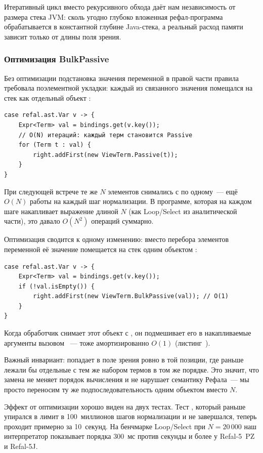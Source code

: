 Итеративный цикл вместо рекурсивного обхода даёт нам независимость от
размера стека JVM: сколь угодно глубоко вложенная рефал-программа
обрабатывается в константной глубине Java-стека, а реальный расход
памяти зависит только от длины поля зрения.

\subsubsection{Оптимизация BulkPassive}
\label{subsubsec:bulkpassive}

Без оптимизации подстановка значения переменной в правой части правила
требовала поэлементной укладки: каждый  из связанного значения
помещался на стек  как отдельный объект :

\begin{longlisting}
\caption{Наивная укладка переменной (до оптимизации)}\label{lst:var-naive}
\begin{verbatim}
case refal.ast.Var v -> {
    Expr<Term> val = bindings.get(v.key());
    // O(N) итераций: каждый терм становится Passive
    for (Term t : val) {
        right.addFirst(new ViewTerm.Passive(t));
    }
}
\end{verbatim}
\end{longlisting}

При следующей встрече  те же $N$ элементов снимались
с  по одному~--- ещё $O(N)$ работы на каждый шаг нормализации.
В программе, которая на каждом шаге накапливает выражение длиной $N$
(как Loop/Select из аналитической части), это давало $O(N^2)$
операций суммарно.

Оптимизация сводится к одному изменению: вместо перебора элементов
переменной её значение помещается на стек одним объектом :

\begin{longlisting}
\caption{Укладка переменной через BulkPassive (O(1))}\label{lst:var-bulk}
\begin{verbatim}
case refal.ast.Var v -> {
    Expr<Term> val = bindings.get(v.key());
    if (!val.isEmpty()) {
        right.addFirst(new ViewTerm.BulkPassive(val)); // O(1)
    }
}
\end{verbatim}
\end{longlisting}

Когда обработчик  снимает этот объект с ,
он подмешивает его в накапливаемые аргументы вызовом ~---
тоже амортизированно $O(1)$ (листинг~).

Важный инвариант:  попадает в поле зрения ровно в той
позиции, где раньше лежали бы отдельные  с тем же набором
термов в том же порядке. Это значит, что замена не меняет порядок
вычисления и не нарушает семантику Рефала~--- мы просто переносим
ту же подпоследовательность одним объектом вместо $N$.

Эффект от оптимизации хорошо виден на двух тестах. Тест
, который раньше упирался в лимит в 100~миллионов
шагов нормализации и не завершался, теперь проходит примерно за
10~секунд. На бенчмарке Loop/Select при $N = 20\,000$ наш интерпретатор
показывает порядка 300~мс против секунды и более у Refal-5~PZ и
Refal-5J.
